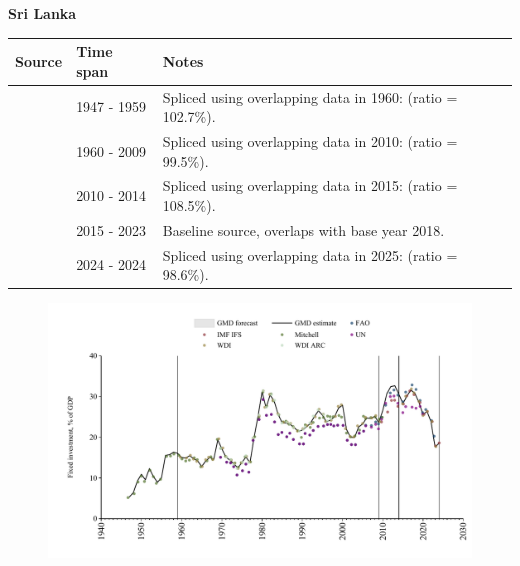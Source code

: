 \documentclass[12pt,a4paper,landscape]{article}
\begin{document}
\begin{adjustbox}{max totalsize={\paperwidth}{\paperheight},center}
\begin{minipage}[t][\textheight][t]{\textwidth}
\vspace*{0.5cm}
{}
\begin{center}
{\Large\bfseries Sri Lanka}
\end{center}
\vspace{0.5cm}
\begin{table}[H]
\centering
\small
\begin{tabular}{|l|l|l|}
\hline
\textbf{Source} & \textbf{Time span} & \textbf{Notes} \\
\hline
\rowcolor{white}\cite{Mitchell}& 1947 - 1959 &Spliced using overlapping data in 1960: (ratio = 102.7\%).\\
\rowcolor{lightgray}\cite{WDI}& 1960 - 2009 &Spliced using overlapping data in 2010: (ratio = 99.5\%).\\
\rowcolor{white}\cite{UN}& 2010 - 2014 &Spliced using overlapping data in 2015: (ratio = 108.5\%).\\
\rowcolor{lightgray}\cite{WDI}& 2015 - 2023 &Baseline source, overlaps with base year 2018.\\
\rowcolor{white}\cite{IMF_IFS}& 2024 - 2024 &Spliced using overlapping data in 2025: (ratio = 98.6\%).\\
\hline
\end{tabular}
\end{table}
\begin{figure}[H]
\centering
\includegraphics[width=\textwidth,height=0.6\textheight,keepaspectratio]{graphs/LKA_finv_GDP.pdf}
\end{figure}
\end{minipage}
\end{adjustbox}
\end{document}

